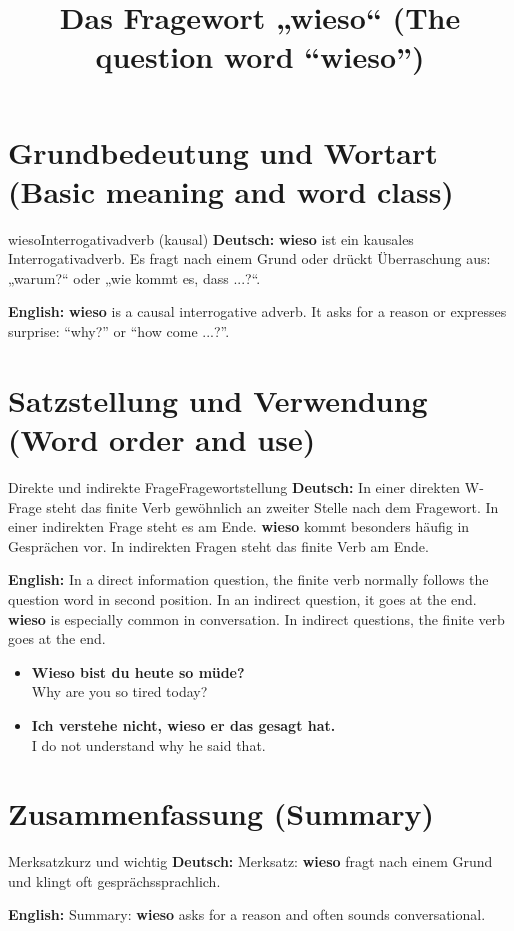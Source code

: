 \documentclass[a4paper,11pt]{article}
\title{Das Fragewort „wieso“ (The question word “wieso”)}
\date{}
\newcommand{\GermanText}[1]{\textbf{Deutsch: }#1\par}
\newcommand{\EnglishText}[1]{{\small\color{SoftGray}\textbf{English: }#1\par}}
\newcommand{\ExampleItem}[2]{\item \textbf{#1}\\{\small\color{SoftGray}#2}}
\begin{document}
\maketitle
\tableofcontents
\newpage
\section{Grundbedeutung und Wortart (Basic meaning and word class)}
\begin{grammarentry}{wieso}{Interrogativadverb (kausal)}
\GermanText{\textbf{wieso} ist ein kausales Interrogativadverb. Es fragt nach einem Grund oder drückt Überraschung aus: „warum?“ oder „wie kommt es, dass ...?“.}
\EnglishText{\textbf{wieso} is a causal interrogative adverb. It asks for a reason or expresses surprise: “why?” or “how come ...?”.}

\end{grammarentry}
\section{Satzstellung und Verwendung (Word order and use)}
\begin{grammarentry}{Direkte und indirekte Frage}{Fragewortstellung}
\GermanText{In einer direkten W-Frage steht das finite Verb gewöhnlich an zweiter Stelle nach dem Fragewort. In einer indirekten Frage steht es am Ende. \textbf{wieso} kommt besonders häufig in Gesprächen vor. In indirekten Fragen steht das finite Verb am Ende.}
\EnglishText{In a direct information question, the finite verb normally follows the question word in second position. In an indirect question, it goes at the end. \textbf{wieso} is especially common in conversation. In indirect questions, the finite verb goes at the end.}
\end{grammarentry}
\begin{exbox}\begin{itemize}
\ExampleItem{Wieso bist du heute so müde?}{Why are you so tired today?}
\ExampleItem{Ich verstehe nicht, wieso er das gesagt hat.}{I do not understand why he said that.}
\end{itemize}\end{exbox}
\section{Zusammenfassung (Summary)}
\begin{grammarentry}{Merksatz}{kurz und wichtig}
\GermanText{Merksatz: \textbf{wieso} fragt nach einem Grund und klingt oft gesprächssprachlich.}
\EnglishText{Summary: \textbf{wieso} asks for a reason and often sounds conversational.}
\end{grammarentry}
\end{document}
